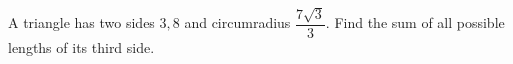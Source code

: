 A triangle has two sides $3,8$ and circumradius $\dfrac{7\sqrt3}{3}$. Find the sum of all possible lengths of its third side.
